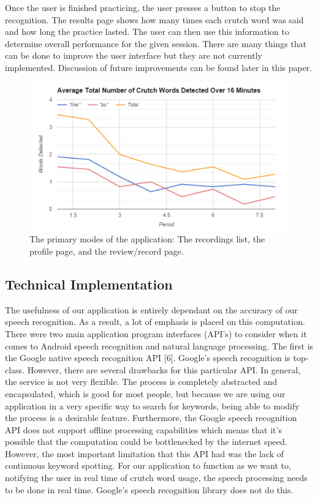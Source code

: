 \documentclass{sigchi}
\begin{document}
Once the user is finished practicing, the user presses a button to stop the recognition. The results page shows how many times each crutch word was said and how long the practice lasted. The user can then use this information to determine overall performance for the given session. There are many things that can be done to improve the user interface but they are not currently implemented. Discussion of future improvements can be found later in this paper.

\begin{figure}[!h]
\centering
\includegraphics[width=0.9\columnwidth]{graph}
\caption{The primary modes of the application: The recordings list, the profile page, and the review/record page.
}
\label{fig:figure1}
\end{figure}


\subsection{Technical Implementation}

The usefulness of our application is entirely dependant on the accuracy of our speech recognition. As a result, a lot of emphasis is placed on this computation. There were two main application program interfaces (API’s) to consider when it comes to Android speech recognition and natural language processing. The first is the Google native speech recognition API [6]. Google’s speech recognition is top-class. However, there are several drawbacks for this particular API. In general, the service is not very flexible. The process is completely abstracted and encapsulated, which is good for most people, but because we are using our application in a very specific way to search for keywords, being able to modify the process is a desirable feature. Furthermore, the Google speech recognition API does not support offline processing capabilities which means that it’s possible that the computation could be bottlenecked by the internet speed. However, the most important limitation that this API had was the lack of continuous keyword spotting. For our application to function as we want to, notifying the user in real time of crutch word usage, the speech processing needs to be done in real time. Google’s speech recognition library does not do this. 
\end{document}

